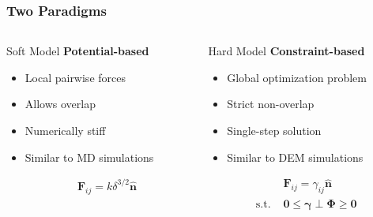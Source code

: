 \documentclass[10pt,t]{beamer}
\begin{document}
\begin{frame}
    \frametitle{Two Paradigms}

    \vspace{-0.5cm}
    \begin{columns}
        \begin{column}{0.5\textwidth}
            \begin{block}{Soft Model}
                \textbf{Potential-based}

                \begin{itemize}
                    \item Local pairwise forces
                    \item Allows overlap
                    \item Numerically stiff
                    \item Similar to MD simulations
                \end{itemize}

                \begin{equation*}
                    \begin{align}
                                  & \mathbf{F}_{ij} = k \delta^{3/2} \hat{\mathbf{n}} \\
                        \text{  } &
                    \end{align}
                \end{equation*}
                \vfill
            \end{block}
        \end{column}

        \begin{column}{0.5\textwidth}
            \begin{block}{Hard Model \cite{Weady2024}}
                \textbf{Constraint-based}

                \begin{itemize}
                    \item Global optimization problem
                    \item Strict non-overlap
                    \item Single-step solution
                    \item Similar to DEM simulations
                \end{itemize}

                \begin{equation*}
                    \begin{align}
                                     & \mathbf{F}_{ij} = \gamma_{ij} \hat{\mathbf{n}}                              \\
                        \text{s.t. } & \mathbf{0} \leq \boldsymbol{\gamma} \perp \boldsymbol{\Phi} \geq \mathbf{0}
                    \end{align}
                \end{equation*}
                \vfill
            \end{block}
        \end{column}
    \end{columns}

\end{frame}
\end{document}
